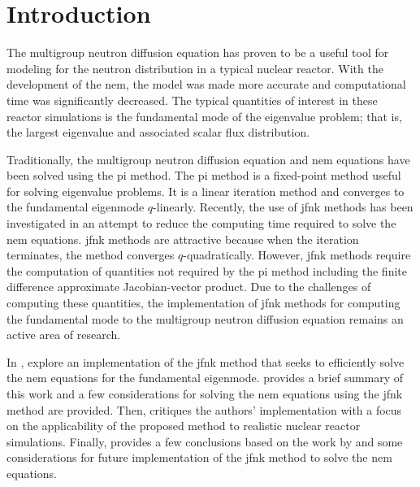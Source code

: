 \section{Introduction}
\label{sec:introduction}

  The multigroup neutron diffusion equation has proven to be a useful tool for
  modeling for the neutron distribution in a typical nuclear reactor. With the
  development of the \gls{nem}, the model was made more accurate and
  computational time was significantly decreased. The typical quantities of
  interest in these reactor simulations is the fundamental mode of the
  eigenvalue problem; that is, the largest eigenvalue and associated scalar flux
  distribution.

  Traditionally, the multigroup neutron diffusion equation and \gls{nem}
  equations have been solved using the \gls{pi} method. The \gls{pi} method is a
  fixed-point method useful for solving eigenvalue problems. It is a linear
  iteration method and converges to the fundamental eigenmode $q$-linearly.
  Recently, the use of \gls{jfnk} methods has been investigated in an attempt to
  reduce the computing time required to solve the \gls{nem} equations.
  \gls{jfnk} methods are attractive because when the iteration terminates, the
  method converges $q$-quadratically. However, \gls{jfnk} methods require the
  computation of quantities not required by the \gls{pi} method including the
  finite difference approximate Jacobian-vector product. Due to the challenges
  of computing these quantities, the implementation of \gls{jfnk} methods for
  computing the fundamental mode to the multigroup neutron diffusion equation
  remains an active area of research.

  In , \citeauthor{qe2paper} explore an implementation of
  the \gls{jfnk} method that seeks to efficiently solve the \gls{nem} equations
  for the fundamental eigenmode.  provides a brief summary of
  this work and a few considerations for solving the \gls{nem} equations using
  the \gls{jfnk} method are provided. Then,  critiques the
  authors' implementation with a focus on the applicability of the proposed
  method to realistic nuclear reactor simulations. Finally,
   provides a few conclusions based on the work by
  \citeauthor{qe2paper} and some considerations for future implementation of the 
  \gls{jfnk} method to solve the \gls{nem} equations.
